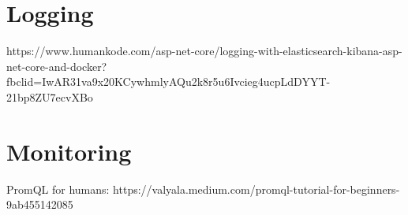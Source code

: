 \documentclass[main.tex]{subfiles}
\begin{document}
    \section{Logging}
        https://www.humankode.com/asp-net-core/logging-with-elasticsearch-kibana-asp-net-core-and-docker?fbclid=IwAR31va9x20KCywhmlyAQu2k8r5u6Ivcieg4ucpLdDYYT-21bp8ZU7ecvXBo
    
    \section{Monitoring}
        PromQL for humans: https://valyala.medium.com/promql-tutorial-for-beginners-9ab455142085
\end{document}
